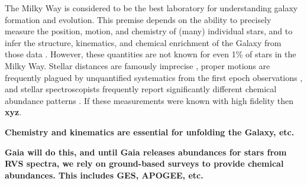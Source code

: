 \documentclass[preprint,trackchanges]{aastex}
\newcommand{\stub}[1]{\textbf{#1}}
\begin{document}
The Milky Way is considered to be the best laboratory for understanding galaxy formation and evolution.  This premise depends on the ability to precisely measure the position, motion, and chemistry of (many) individual stars, and to infer the structure, kinematics, and chemical enrichment of the Galaxy from those data \citep[e.g.,][]{Deason_2011,Ness_2012,Ness_2013a,Ness_2013b,Casey_2012,Casey_2013,Casey_2014a,Casey_2014b}.  %
However, these quantities are not known for even 1\% of stars in the Milky Way.  Stellar distances are famously imprecise \citep[e.g.,][]{van_Leeuwen_2007,Jofre_2015,Madler_2016}, proper motions are frequently plagued by unquantified systematics from the first epoch observations \citep[e.g.,][]{Casey_Schlaufman_2015}, and stellar spectroscopists frequently report significantly different chemical abundance patterns \citep{Smiljanic_2014}.  If these measurements were known with high fidelity then \stub{xyz}.









\stub{Chemistry and kinematics are essential for unfolding the Galaxy, etc.}

\stub{
Gaia will do this, and until Gaia releases abundances for stars from RVS 
spectra, we rely on ground-based surveys to provide chemical abundances.
This includes GES, APOGEE, etc.
}
\end{document}
